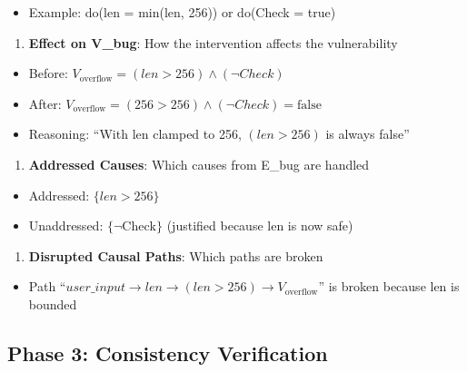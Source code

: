 \documentclass[conference,compsoc]{IEEEtran}
\providecommand{\tightlist}{\setlength{\itemsep}{0pt}\setlength{\parskip}{0pt}}
\begin{document}
\begin{itemize}
\tightlist
\item
  Example: do(len = min(len, 256)) or do(Check = true)
\end{itemize}

\begin{enumerate}
\def\labelenumi{\arabic{enumi}.}
\setcounter{enumi}{2}
\tightlist
\item
  \textbf{Effect on V\_bug}: How the intervention affects the
  vulnerability
\end{enumerate}

\begin{itemize}
\item
  Before: $V_{\text{overflow}} = (len > 256) \land (\lnot Check)$
\item
  After: $V_{\text{overflow}} = (256 > 256) \land (\lnot Check) = \text{false}$
\item
  Reasoning: ``With len clamped to 256, $(len > 256)$ is
  always false''
\end{itemize}

\begin{enumerate}
\def\labelenumi{\arabic{enumi}.}
\setcounter{enumi}{3}
\tightlist
\item
  \textbf{Addressed Causes}: Which causes from E\_bug are handled
\end{enumerate}

\begin{itemize}
\item
  Addressed: \(\{len > 256\}\)
\item
  Unaddressed: \(\{\lnot \text{Check}\}\) (justified because len is now safe)
\end{itemize}

\begin{enumerate}
\def\labelenumi{\arabic{enumi}.}
\setcounter{enumi}{4}
\tightlist
\item
  \textbf{Disrupted Causal Paths}: Which paths are broken
\end{enumerate}

\begin{itemize}
\tightlist
\item
  Path ``$user\_input \rightarrow len \rightarrow (len > 256) \rightarrow V_{\text{overflow}}$'' is
  broken because len is bounded
\end{itemize}

\subsection{Phase 3: Consistency
Verification}\label{phase-3-consistency-verification}
\end{document}
